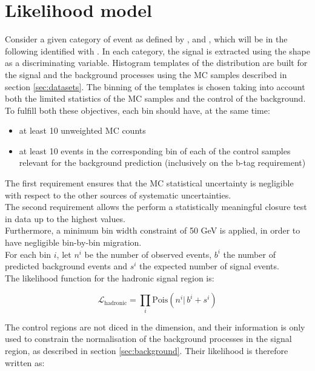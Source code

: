 \section{Likelihood model}
\label{sec:likelihood}

Consider a given category of event as defined by \njet, \nb and \HT, which will be in the following identified with \htcat. 
In each category, the signal is extracted using the \mht shape as a discriminating variable. 
Histogram templates of the \mht distribution are built for the signal and the background processes 
using the MC samples described in section \ref{sec:datasets}. 
The binning of the templates is chosen taking into account both the limited statistics of the MC samples and 
the control of the background. To fulfill both these objectives, each bin should have, at the same time:
\begin{itemize}
\item at least 10 unweighted MC counts
\item at least 10 events in the corresponding bin of each of the control samples relevant for the background prediction (inclusively on the b-tag requirement)
\end{itemize}

The first requirement ensures that the MC statistical uncertainty is negligible with respect to the other sources of systematic uncertainties. \\
The second requirement allows the perform a statistically meaningful closure test in data up to the highest \mht values. \\
Furthermore, a minimum bin width constraint of 50 GeV is applied, in order to have negligible bin-by-bin migration. \\ 

For each \mht bin $i$, let $n^{i}$ be the number of observed events, $b^{i}$ the number of predicted 
background events and $s^{i}$ the expected number of signal events. \\
The likelihood function for the hadronic signal region is:

\begin{equation}
\mathcal{L}_{\mathrm{hadronic}}=\prod_i \mathrm{Pois}(n^i |\, b^i + s^i)
\label{eq:hadronicLikelihood}
\end{equation}

The control regions are not diced in the \mht dimension, and their information is only used to constrain the normalisation of the background processes 
in the signal region, as described in section \ref{sec:background}. 
Their likelihood is therefore written as:

